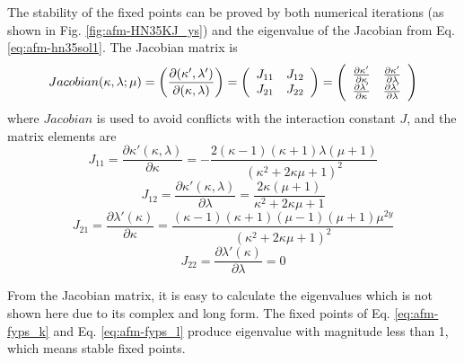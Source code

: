 The stability of the fixed points can be proved by both numerical iterations (as shown in Fig. \ref{fig:afm-HN35KJ_ys}) and the eigenvalue of the Jacobian from Eq. \ref{eq:afm-hn35sol1}. The Jacobian matrix is
\begin{equation}
  Jacobian(\kappa,\lambda; \mu) =
\left(\frac{\partial(\kappa', \lambda')}{\partial(\kappa, \lambda)}\right)=
\left( {\begin{array}{*{50}c}
J_{11} & J_{12}\\
J_{21} & J_{22}
 \end{array} } \right)
=
\left( {\begin{array}{*{50}c}
\frac{\partial \kappa'}{\partial \kappa}&\frac{\partial \kappa'}{\partial \lambda}\\
\frac{\partial \lambda'}{\partial \kappa}&\frac{\partial \lambda'}{\partial \lambda}\\
 \end{array} } \right)
\label{eq:hn35-j}
\end{equation}
where $Jacobian$ is used to avoid conflicts with the interaction constant $J$, and the matrix elements are
\begin{equation}
J_{11} = \frac{\partial \kappa'(\kappa, \lambda)}{\partial \kappa}=-\frac{2 (\kappa -1) (\kappa +1) \lambda  (\mu +1)}{\left(\kappa ^2+2 \kappa  \mu +1\right)^2}
\end{equation}
\begin{equation}
J_{12} =  \frac{\partial \kappa'(\kappa, \lambda)}{\partial \lambda}= \frac{2 \kappa  (\mu +1)}{\kappa ^2+2 \kappa  \mu +1}
\end{equation}
\begin{equation}
J_{21} =\frac{\partial \lambda'(\kappa)}{\partial \kappa}=\frac{(\kappa -1) (\kappa +1) (\mu -1) (\mu +1) \mu ^{2 y}}{\left(\kappa ^2+2 \kappa  \mu +1\right)^2}
\end{equation}
\begin{equation}
J_{22} = \frac{\partial \lambda'(\kappa)}{\partial \lambda}=0
\end{equation}

From the Jacobian matrix, it is easy to calculate the eigenvalues which is not shown here due to its complex and long form. The fixed points of Eq. \ref{eq:afm-fyps_k} and Eq. \ref{eq:afm-fyps_l} produce eigenvalue with magnitude less than 1, which means stable fixed points.

